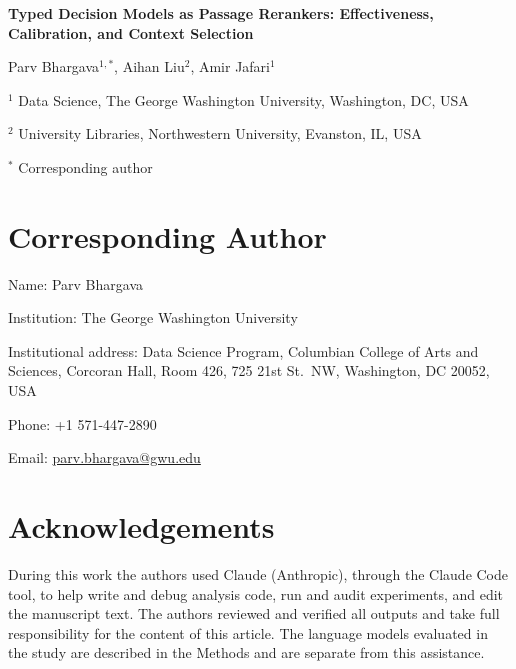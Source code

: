 \documentclass[12pt,a4paper]{article}
\begin{document}

\begin{center}

{\Large\bfseries
Typed Decision Models as Passage Rerankers: Effectiveness, Calibration, and Context Selection
\par}

\vspace{1.2cm}

Parv Bhargava$^{1,*}$,
Aihan Liu$^{2}$,
Amir Jafari$^{1}$


\vspace{0.6cm}

\small
$^{1}$ Data Science, The George Washington University, Washington, DC, USA

$^{2}$ University Libraries, Northwestern University, Evanston, IL, USA

\vspace{0.3cm}
$^{*}$ Corresponding author

\end{center}

\vspace{0.8cm}

\section*{Corresponding Author}

Name: Parv Bhargava

Institution: The George Washington University

Institutional address: Data Science Program, Columbian College of Arts and Sciences, Corcoran Hall, Room 426, 725 21st St.\ NW, Washington, DC 20052, USA

Phone: +1 571-447-2890

Email: \href{mailto:parv.bhargava@gwu.edu}{parv.bhargava@gwu.edu}


\section*{Acknowledgements}

During this work the authors used Claude (Anthropic), through the Claude Code tool, to help write and debug analysis code, run and audit experiments, and edit the manuscript text. The authors reviewed and verified all outputs and take full responsibility for the content of this article. The language models evaluated in the study are described in the Methods and are separate from this assistance.
\end{document}

